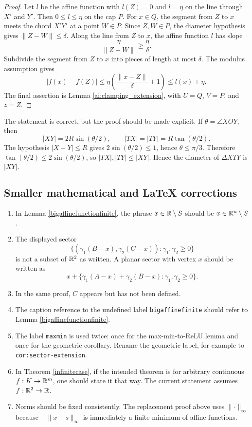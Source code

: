 \begin{proof}
Let $l$ be the affine function with $l(Z)=0$ and $l=\eta$ on the line through $X'$ and $Y'$.  Then $0\leq l\leq\eta$ on the cap $P$.  For $x\in Q$, the segment from $Z$ to $x$ meets the chord $X'Y'$ at a point $W\in P$.  Since $Z,W\in P$, the diameter hypothesis gives $\lVert Z-W\rVert\leq\delta$.  Along the line from $Z$ to $x$, the affine function $l$ has slope
\[
\frac{\eta}{\lVert Z-W\rVert}\geq\frac{\eta}{\delta}.
\]
Subdivide the segment from $Z$ to $x$ into pieces of length at most $\delta$.  The modulus assumption gives
\[
|f(x)-f(Z)|\leq \eta\left(\frac{\lVert x-Z\rVert}{\delta}+1\right)
\leq l(x)+\eta.
\]
The final assertion is Lemma \ref{ai:clamping_extension}, with $U=Q$, $V=P$, and $z=Z$.
\end{proof}

\begin{remark}
The statement is correct, but the proof should be made explicit.  If $\theta=\angle XOY$, then
\[
|XY|=2R\sin(\theta/2),
\qquad
|TX|=|TY|=R\tan(\theta/2).
\]
The hypothesis $|X-Y|\leq R$ gives $2\sin(\theta/2)\leq1$, hence $\theta\leq\pi/3$.  Therefore $\tan(\theta/2)\leq2\sin(\theta/2)$, so $|TX|,|TY|\leq|XY|$.  Hence the diameter of $\Delta XTY$ is $|XY|$.
\end{remark}

\subsection{Smaller mathematical and LaTeX corrections}

\begin{enumerate}
    \item In Lemma \ref{bigaffinefunctionfinite}, the phrase $x\in\mathbb{R}\setminus S$ should be $x\in\mathbb{R}^n\setminus S$.
    \item The displayed sector
    \[
    \{(\gamma_1(B-x),\gamma_2(C-x)):\gamma_1,\gamma_2\geq0\}
    \]
    is not a subset of $\mathbb{R}^2$ as written.  A planar sector with vertex $x$ should be written as
    \[
    x+\{\gamma_1(A-x)+\gamma_2(B-x):\gamma_1,\gamma_2\geq0\}.
    \]
    \item In the same proof, $C$ appears but has not been defined.
    \item The caption reference to the undefined label \texttt{bigaffinefinite} should refer to Lemma \ref{bigaffinefunctionfinite}.
    \item The label \texttt{maxmin} is used twice: once for the max-min-to-ReLU lemma and once for the geometric corollary.  Rename the geometric label, for example to \texttt{cor:sector-extension}.
    \item In Theorem \ref{infinitecase}, if the intended theorem is for arbitrary continuous $f:K\to\mathbb{R}^m$, one should state it that way.  The current statement assumes $f:\mathbb{R}^2\to\mathbb{R}$.
    \item Norms should be fixed consistently.  The replacement proof above uses $\lVert \cdot\rVert_\infty$ because $-\lVert x-s\rVert_\infty$ is immediately a finite minimum of affine functions.
\end{enumerate}
